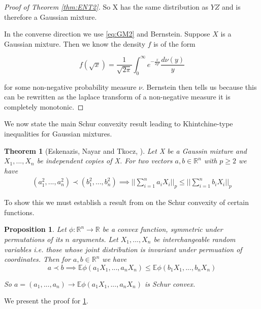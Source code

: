 \documentclass[10pt]{article}
\newcommand{\E}{\mathbb{E}}
\newcommand{\1}{\textbf{1}}
\newcommand{\R}{\mathbb{R}}
\newtheorem{theorem}{Theorem}[subsection]
\newtheorem{prop}{Proposition}[subsection]
\theoremstyle{remark}
\theoremstyle{definition}
\begin{document}
\begin{proof}[Proof of Theorem \ref{thm:ENT2}]
So X has the same distribution as $YZ$ and is therefore a Gaussian mixture.

In the converse direction we use \ref{eq:GM2} and Bernstein. Suppose $X$ is a Gaussian mixture. Then we know the density $f$ is of the form

\begin{equation*}
	f(\sqrt{x}) = \frac{1}{\sqrt{2\pi}} \int_0^{\infty} e^{-\frac{x}{2y^2}} \frac{d\nu(y)}{y}
\end{equation*}

for some non-negative probability measure $\nu$. Bernstein then tells us because this can be rewritten as the laplace transform of a non-negative measure it is completely monotonic. 
\end{proof}


We now state the main Schur convexity result leading to Khintchine-type inequalities for Gaussian mixtures.

\begin{theorem}[Eskenazis, Nayar and Tkocz, \cite{ENT}]\label{thm:ENT3}
	Let X be a Gaussin mixture and $X_1,...,X_n$ be independent copies of X. For two vectors $a,b \in \R^n$ with $p \geq 2$ we have
	\begin{align*}
		(a_1^2,...,a_n^2) \prec (b_1^2,...,b_n^2) \implies ||\sum_{i=1}^n a_iX_i||_p \leq ||\sum_{i=1}^n b_iX_i||_p
	\end{align*}
\end{theorem}

To show this we must establish a result from on the Schur convexity of certain functions. 


\begin{prop}
	Let $\phi: \R^n \to \R$ be a convex function, symmetric under permutations of its $n$ arguments. Let $X_1,...,X_n$ be interchangeable random variables i.e. those whose joint distribution is invariant under permuation of coordinates. Then for $a,b \in \R^n$ we have
	\begin{equation}
		a \prec b \implies \E\phi(a_1X_1,...,a_nX_n) \leq \E \phi(b_1X_1,...,b_nX_n)
	\end{equation}

	So $a=(a_1,...,a_n) \to \E \phi(a_1X_1,...,a_nX_n)$ is Schur convex.
\end{prop} We present the proof for \ref{thm:ENT3}. 
\end{document}
